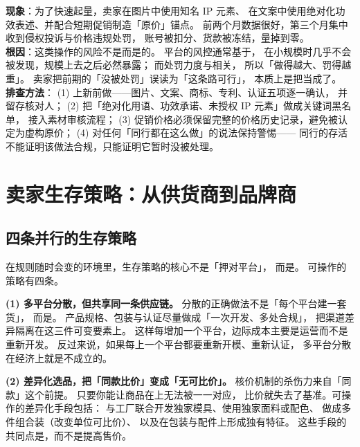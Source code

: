 \begin{pitfall}
\textbf{现象}：为了快速起量，卖家在图片中使用知名 IP 元素、
在文案中使用绝对化功效表述、并配合短期促销制造「原价」锚点。
前两个月数据很好，第三个月集中收到侵权投诉与价格违规处罚，
账号被扣分、货款被冻结，量掉到零。\\
\textbf{根因}：这类操作的风险不是而是的。
平台的风控通常基于，
在小规模时几乎不会被发现，规模上去之后必然暴露；
而处罚力度与相关，
所以「做得越大、罚得越重」。
卖家把前期的「没被处罚」误读为「这条路可行」，
本质上是把当成了。\\
\textbf{排查方法}：
(1) 上新前做——图片、文案、商标、专利、认证五项逐一确认，
        并留存核对人；
(2) 把「绝对化用语、功效承诺、未授权 IP 元素」做成关键词黑名单，
        接入素材审核流程；
(3) 促销价格必须保留完整的价格历史记录，避免被认定为虚构原价；
(4) 对任何「同行都在这么做」的说法保持警惕——
        同行的存活不能证明该做法合规，只能证明它暂时没被处理。
\end{pitfall}

\section{卖家生存策略：从供货商到品牌商}
\label{sec:plat-strategy}

\subsection{四条并行的生存策略}

在规则随时会变的环境里，生存策略的核心不是「押对平台」，
而是。
可操作的策略有四条。

\textbf{(1) 多平台分散，但共享同一条供应链。}
分散的正确做法不是「每个平台建一套货」，
而是。
产品规格、包装与认证尽量做成「一次开发、多处合规」，
把渠道差异隔离在这三件可变要素上。
这样每增加一个平台，边际成本主要是运营而不是重新开发。
反过来说，如果每上一个平台都要重新开模、重新认证，
多平台分散在经济上就是不成立的。

\textbf{(2) 差异化选品，把「同款比价」变成「无可比价」。}
核价机制的杀伤力来自「同款」这个前提。
只要你能让商品在上无法被一一对应，
比价就失去了基准。可操作的差异化手段包括：
与工厂联合开发独家模具、使用独家面料或配色、
做成多件组合装（改变单位可比价）、
以及在包装与配件上形成独有特征。
这些手段的共同点是，而不是提高售价。

